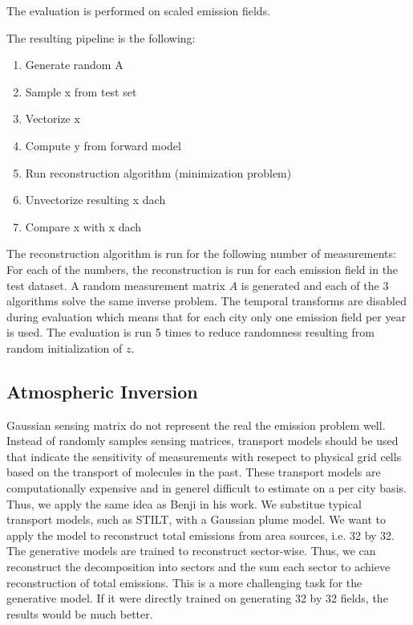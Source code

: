 The evaluation is performed on scaled emission fields.

The resulting pipeline is the following:
\begin{enumerate}
    \item Generate random A
    \item Sample x from test set
    \item Vectorize x
    \item Compute y from forward model
    \item Run reconstruction algorithm (minimization problem)
    \item Unvectorize resulting x dach
    \item Compare x with x dach
\end{enumerate}

The reconstruction algorithm is run for the following number of measurements:
For each of the numbers, the reconstruction is run for each emission field in the test dataset.
A random measurement matrix $A$ is generated and each of the $3$ algorithms solve the same inverse problem.
The temporal transforms are disabled during evaluation which means that for each city only one emission field per year is used.
The evaluation is run 5 times to reduce randomness resulting from random initialization of $z$.

\subsection{Atmospheric Inversion}

Gaussian sensing matrix do not represent the real the emission problem well.
Instead of randomly samples sensing matrices, transport models should be used that indicate the sensitivity of measurements with resepect to physical grid cells based on the transport of molecules in the past.
These transport models are computationally expensive and in generel difficult to estimate on a per city basis.
Thus, we apply the same idea as Benji in his work.
We substitue typical transport models, such as STILT, with a Gaussian plume model.
We want to apply the model to reconstruct total emissions from area sources, i.e. 32 by 32.
The generative models are trained to reconstruct sector-wise.
Thus, we can reconstruct the decomposition into sectors and the sum each sector to achieve reconstruction of total emissions.
This is a more challenging task for the generative model.
If it were directly trained on generating 32 by 32 fields, the results would be much better.


